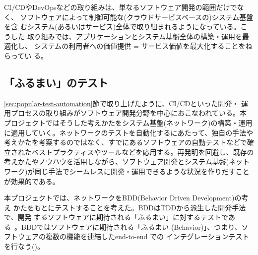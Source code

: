 CI/CDやDevOpsなどの取り組みは、単なるソフトウェア開発の範囲だけでなく、
ソフトウェアによって制御可能な(クラウドサービスベースの)システム基盤を含
むシステム(あるいはサービス)全体で取り組まれるようになっている。こうした
取り組みでは、アプリケーションとシステム基盤全体の構築・運用を最適化し、
システムの利用者への価値提供 = サービス価値を最大化することをねらってい
る。

  \subsection{「ふるまい」のテスト}
  \label{sec:behavior-test}


\ref{sec:popular-test-automation}節で取り上げたように、CI/CDといった開発・
運用プロセスの取り組みがソフトウェア開発分野を中心におこなわれている。本
プロジェクトではそうした考えかたをシステム基盤(ネットワーク)の構築・運用
に適用していく。ネットワークのテストを自動化するにあたって、独自の手法や
考えかたを考案するのではなく、すでにあるソフトウェアの自動テストなどで確
立されたベストプラクティスやツールなどを応用する。再発明を回避し、既存の
考えかたやノウハウを活用しながら、ソフトウェア開発とシステム基盤(ネット
ワーク)が同じ手法でシームレスに開発・運用できるような状況を作りだすこと
が効果的である。

本プロジェクトでは、ネットワークをBDD(Behavior Driven Development)の考え
かたをもとにテストすることを考えた。BDDはTDDから派生した開発手法で、開発
するソフトウェアに期待される「ふるまい」に対するテストであ
る~\cite{wikipedia-bdd}。BDDではソフトウェアに期待される「ふるまい
(Behavior)」、つまり、ソフトウェアの複数の機能を連結したend-to-end での
インテグレーションテストを行なう()。

